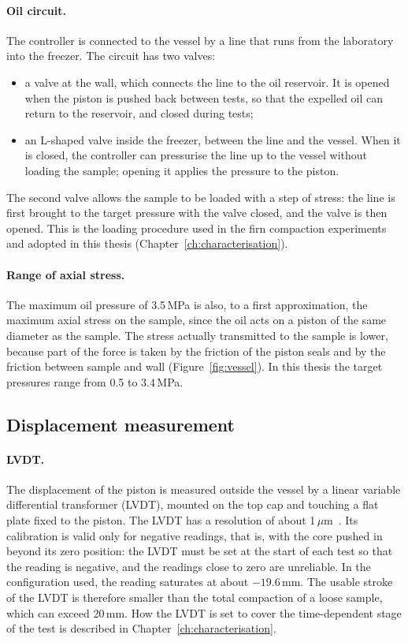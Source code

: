 \paragraph{Oil circuit.} The controller is connected to the vessel by a line that runs from the laboratory into the freezer. The circuit has two valves:
\begin{itemize}
    \item a valve at the wall, which connects the line to the oil reservoir. It is opened when the piston is pushed back between tests, so that the expelled oil can return to the reservoir, and closed during tests;
    \item an L-shaped valve inside the freezer, between the line and the vessel. When it is closed, the controller can pressurise the line up to the vessel without loading the sample; opening it applies the pressure to the piston.
\end{itemize}
The second valve allows the sample to be loaded with a step of stress: the line is first brought to the target pressure with the valve closed, and the valve is then opened. This is the loading procedure used in the firn compaction experiments and adopted in this thesis (Chapter~\ref{ch:characterisation}).

\paragraph{Range of axial stress.} The maximum oil pressure of 3.5\,MPa is also, to a first approximation, the maximum axial stress on the sample, since the oil acts on a piston of the same diameter as the sample. The stress actually transmitted to the sample is lower, because part of the force is taken by the friction of the piston seals and by the friction between sample and wall (Figure~\ref{fig:vessel}). In this thesis the target pressures range from 0.5 to 3.4\,MPa.

\subsection{Displacement measurement}
\label{subsec:displacement}

\paragraph{LVDT.} The displacement of the piston is measured outside the vessel by a linear variable differential transformer (LVDT), mounted on the top cap and touching a flat plate fixed to the piston. The LVDT has a resolution of about 1\,$\mu$m~\cite{skarbek2025data}. Its calibration is valid only for negative readings, that is, with the core pushed in beyond its zero position: the LVDT must be set at the start of each test so that the reading is negative, and the readings close to zero are unreliable. In the configuration used, the reading saturates at about $-19.6$\,mm.
The usable stroke of the LVDT is therefore smaller than the total compaction of a loose sample, which can exceed 20\,mm. How the LVDT is set to cover the time-dependent stage of the test is described in Chapter~\ref{ch:characterisation}.

